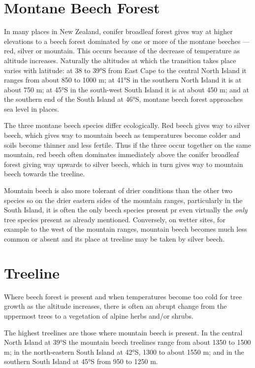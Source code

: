 \section{Montane Beech Forest}

In many places in New Zealand, conifer broadleaf forest gives way at higher elevations to a beech forest dominated by one or more of the montane beeches --- red, silver or mountain.
This occurs because of the decrease of temperature as altitude increases.
Naturally the altitudes at which the transition takes place varies with latitude: at 38 to 39°S from East Cape to the central North Island it ranges from about 850 to 1000 m; at 41°S in the southern North Island it is at about 750 m; at 45°S in the south-west South Island it is at about 450 m; and at the southern end of the South Island at 46°S, montane beech forest approaches sea level in places.

The three montane beech species differ ecologically.
Red beech gives way to silver beech, which gives way to mountain beech as temperatures become colder and soils become thinner and less fertile.
Thus if the three occur together on the same mountain, red beech often dominates immediately above the conifer broadleaf forest giving way upwards to silver beech, which in turn gives way to mountain beech towards the treeline.

Mountain beech is also more tolerant of drier conditions than the other two species so on the drier eastern sides of the mountain ranges, particularly in the South Island, it is often the only beech species present pr even virtually the \emph{only} tree species present as already mentioned.
Conversely, on wetter sites, for example to the west of the mountain ranges, mountain beech becomes much less common or absent and its place at treeline may be taken by silver beech.

\section{Treeline}

Where beech forest is present and when temperatures become too cold for tree growth as the altitude increases, there is often an abrupt change from the uppermost trees to a vegetation of alpine herbs and/or shrubs.

The highest treelines are those where mountain beech is present.
In the central North Island at 39°S the mountain beech treelines range from about 1350 to 1500 m; in the north-eastern South Island at 42°S, 1300 to about 1550 m; and in the southern South Island at 45°S from 950 to 1250 m.

